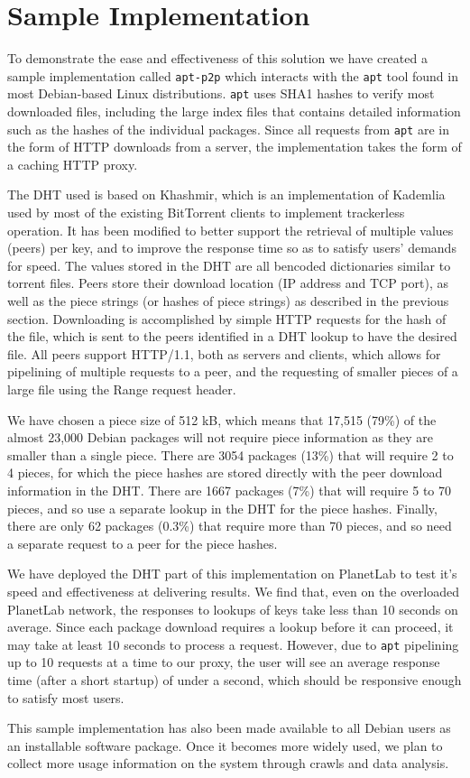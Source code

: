 \documentclass{sig-alt-release2}
\begin{document}
\section{Sample Implementation}

To demonstrate the ease and effectiveness of this solution we have
created a sample implementation called \texttt{apt-p2p} which
interacts with the \texttt{apt} tool found in most Debian-based
Linux distributions. \texttt{apt} uses SHA1 hashes to verify most
downloaded files, including the large index files that contains detailed
information such as the hashes of the individual packages. Since all
requests from \texttt{apt} are in the form of HTTP downloads from a
server, the implementation takes the form of a caching HTTP proxy.

The DHT used is based on Khashmir, which is an implementation of
Kademlia \cite{kademlia} used by most of the existing BitTorrent
clients to implement trackerless operation. It has been modified to
better support the retrieval of multiple values (peers) per key, and to
improve the response time so as to satisfy users' demands for speed.
The values stored in the DHT are all bencoded dictionaries similar
to torrent files. Peers store their download location (IP address
and TCP port), as well as the piece strings (or hashes of piece
strings) as described in the previous section. Downloading is
accomplished by simple HTTP requests for the hash of the file,
which is sent to the peers identified in a DHT lookup to
have the desired file. All peers support HTTP/1.1, both as
servers and clients, which allows for pipelining of multiple
requests to a peer, and the requesting of smaller pieces of a large
file using the Range request header.

We have chosen a piece size of 512 kB, which means that 17,515
(79\%) of the almost 23,000 Debian packages will not require piece
information as they are smaller than a single piece. There are 3054
packages (13\%) that will require 2 to 4 pieces, for which the piece
hashes are stored directly with the peer download information in the
DHT. There are 1667 packages (7\%) that will require 5 to 70 pieces,
and so use a separate lookup in the DHT for the piece hashes.
Finally, there are only 62 packages (0.3\%) that require more than
70 pieces, and so need a separate request to a peer for the
piece hashes.

We have deployed the DHT part of this implementation on PlanetLab to
test it's speed and effectiveness at delivering results. We find
that, even on the overloaded PlanetLab network, the responses to
lookups of keys take less than 10 seconds on average. Since each
package download requires a lookup before it can proceed, it may
take at least 10 seconds to process a request. However, due to
\texttt{apt} pipelining up to 10 requests at a time to our proxy,
the user will see an average response time (after a short startup)
of under a second, which should be responsive enough to satisfy most
users.

This sample implementation has also been made available to all
Debian users as an installable software package. Once it becomes
more widely used, we plan to collect more usage information on the
system through crawls and data analysis.



\end{document}
